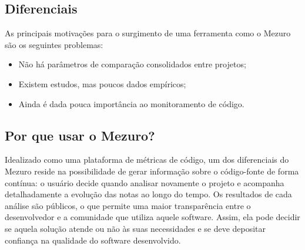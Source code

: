 \documentclass[12pt]{article}
\begin{document}
  \subsection{Diferenciais} \label{subsec:motivacao}
  As principais motivações para o surgimento de uma ferramenta como o Mezuro são os seguintes problemas:
  \begin{itemize}
      \item Não há parâmetros de comparação consolidados entre projetos;
      \item Existem estudos, mas poucos dados empíricos;
      \item Ainda é dada pouca importância ao monitoramento de código.
  \end{itemize}

  \subsection{Por que usar o Mezuro?} \label{sec:projeto-mezuro}
  Idealizado como uma plataforma de métricas de código, um dos diferenciais do Mezuro reside na possibilidade de gerar informação sobre o código-fonte de forma contínua: o usuário decide quando analisar novamente o projeto e acompanha detalhadamente a evolução das notas ao longo do tempo. Os resultados de cada análise são públicos, o que permite uma maior transparência entre o desenvolvedor e a comunidade que utiliza aquele software. Assim, ela pode decidir se aquela solução atende ou não às suas necessidades e se deve depositar confiança na qualidade do software desenvolvido.
\end{document}
